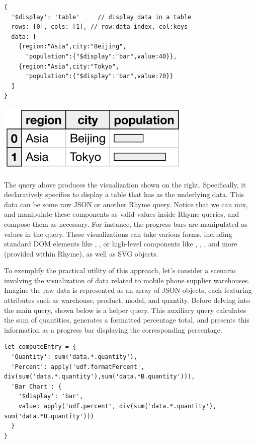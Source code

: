 \documentclass[runningheads]{llncs}
\newcommand{\lang}{Rhyme}
\begin{document}
\hspace{-18pt}
\begin{minipage}{0.6\textwidth}
\begin{lstlisting}[style=JavaScript,columns=flexible]
{
  '$display': 'table'     // display data in a table
  rows: [0], cols: [1], // row:data index, col:keys
  data: [
    {region:"Asia",city:"Beijing",
      "population":{"$display":"bar",value:40}},
    {region:"Asia",city:"Tokyo",
      "population":{"$display":"bar",value:70}}
  ]
}
\end{lstlisting}
\end{minipage}%
\begin{minipage}{0.4\textwidth}
\includegraphics[width=0.7\textwidth]{images/small_table.png}
\end{minipage}

The query above produces the visualization shown on the right.
Specifically, it declaratively specifies to display a table that
has  as the underlying data.
This data can be some raw JSON or another \lang{} query.
Notice that we can mix, and manipulate these components as valid
values inside \lang{} queries, and compose them as necessary.
For instance, the progress bars are manipulated as values in the query.
These visualizations can take various forms, including standard DOM elements
like , , or high-level components like
, , , and more (provided within \lang{}),
as well as SVG objects.

To exemplify the practical utility of this approach, let's consider a scenario involving
the visualization of data related to mobile phone supplier warehouses.
Imagine the raw data is represented as an array of JSON objects, each featuring attributes
such as warehouse, product, model, and quantity.
Before delving into the main query, shown below is a helper query.
This auxiliary query calculates the sum of quantities, generates a formatted percentage
total, and presents this information as a progress bar displaying the corresponding percentage.

\begin{lstlisting}[style=JavaScript,columns=flexible]
let computeEntry = {
  'Quantity': sum('data.*.quantity'),
  'Percent': apply('udf.formatPercent', div(sum('data.*.quantity'),sum('data.*B.quantity'))),
  'Bar Chart': {
    '$display': 'bar',
    value: apply('udf.percent', div(sum('data.*.quantity'), sum('data.*B.quantity')))
  }
}
\end{lstlisting}
\end{document}
